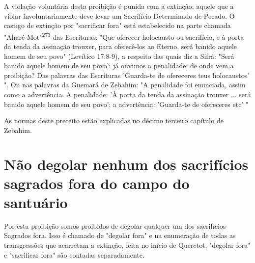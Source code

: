 \begin{itemize}
\begin{enumrate}
\begin{itemize}
\begin{itemize}
\begin{itemize}
A violação voluntária desta proibição é punida com a extinção; aquele
que a violar involuntariamente deve levar um Sacrifício Determinado de
Peca­do. O castigo de extinção por "sacrificar fora" está estabelecido
na parte cha­mada "Aharé Mot"\textsuperscript{273} das Escrituras: "Que
oferecer holocausto ou sacrifício, e à porta da tenda da assinação
trouxer, para oferecê-los ao Eterno, será banido aquele homem de seu
povo" (Levítico 17:8-9), a respeito das quais diz a Sifrá: "Será banido
aquele homem de seu povo': já ouvimos a penalidade; de onde vem a
proibição? Das palavras das Escrituras 'Guarda-te de ofereceres teus
ho­locaustos' ". Ou nas palavras da Guemará de Zebahim: "A penalidade
foi enun­ciada, assim como a advertência. A penalidade: 'À porta da
tenda da assinação trouxer ... será banido aquele homem de seu povo'; a
advertência: 'Guarda-te de ofereceres etc' "

As normas deste preceito estão explicadas no décimo terceiro capí­tulo
de Zebahim.

\section{Não degolar nenhum dos sacrifícios sagrados fora do campo do santuário}

Por esta proibição somos proibidos de degolar qualquer um dos
sa­crifícios Sagrados fora. Isso é chamado de "degolar fora" e na
enumeração de todas as transgressões que acarretam a extinção, feita no
início de Queretot, "degolar fora" e "sacrificar fora" são contadas
separadamente.


\end{itemize}
\end{itemize}
\end{itemize}
\end{enumrate}
\end{itemize}
